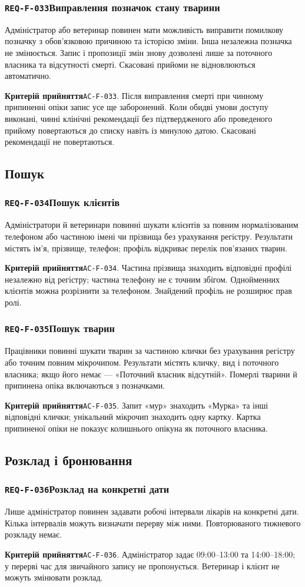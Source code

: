 \documentclass[11pt,a4paper]{article}
\newcommand{\requirement}[4]{%
  \Needspace{7\baselineskip}%
  \subsubsection*{\hypertarget{#1}{\texttt{#1}}\quad #2}%
  #3\par
  \textbf{Критерій прийняття}\quad #4\par\medskip}
\begin{document}
\requirement{REQ-F-033}{Виправлення позначок стану тварини}{Адміністратор або ветеринар повинен мати можливість виправити помилкову позначку з обов’язковою причиною та історією зміни. Інша незалежна позначка не змінюється. Запис і пропозиції змін знову дозволені лише за поточного власника та відсутності смерті. Скасовані прийоми не відновлюються автоматично.}{\hypertarget{AC-F-033}{\texttt{AC-F-033}}. Після виправлення смерті при чинному припиненні опіки запис усе ще заборонений. Коли обидві умови доступу виконані, чинні клінічні рекомендації без підтвердженого або проведеного прийому повертаються до списку навіть із минулою датою. Скасовані рекомендації не повертаються.}

\subsection{Пошук}
\requirement{REQ-F-034}{Пошук клієнтів}{Адміністратори й ветеринари повинні шукати клієнтів за повним нормалізованим телефоном або частиною імені чи прізвища без урахування регістру. Результати містять ім’я, прізвище, телефон; профіль відкриває перелік пов’язаних тварин.}{\hypertarget{AC-F-034}{\texttt{AC-F-034}}. Частина прізвища знаходить відповідні профілі незалежно від регістру; частина телефону не є точним збігом. Однойменних клієнтів можна розрізнити за телефоном. Знайдений профіль не розширює прав ролі.}

\requirement{REQ-F-035}{Пошук тварин}{Працівники повинні шукати тварин за частиною клички без урахування регістру або точним повним мікрочипом. Результати містять кличку, вид і поточного власника; якщо його немає — «Поточний власник відсутній». Померлі тварини й припинена опіка включаються з позначками.}{\hypertarget{AC-F-035}{\texttt{AC-F-035}}. Запит «мур» знаходить «Мурка» та інші відповідні клички; унікальний мікрочип знаходить одну картку. Картка припиненої опіки не показує колишнього опікуна як поточного власника.}

\subsection{Розклад і бронювання}
\requirement{REQ-F-036}{Розклад на конкретні дати}{Лише адміністратор повинен задавати робочі інтервали лікарів на конкретні дати. Кілька інтервалів можуть визначати перерву між ними. Повторюваного тижневого розкладу немає.}{\hypertarget{AC-F-036}{\texttt{AC-F-036}}. Адміністратор задає 09:00–13:00 та 14:00–18:00; у перерві час для звичайного запису не пропонується. Ветеринар і клієнт не можуть змінювати розклад.}
\end{document}
